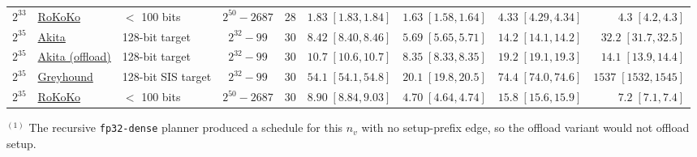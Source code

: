 \begin{table}[H]
\begin{tabular}{@{}lllccrrrr@{}}
$2^{33}$ & \href{https://github.com/lattice-arguments/rokoko/commit/5caba472334f7764645ea2c7c5d612353a670121}{RoKoKo} & $<$ 100 bits & $2^{50}-2687$ & 28 & $1.83\;[1.83, 1.84]$ & $1.63\;[1.58, 1.64]$ & $4.33\;[4.29, 4.34]$ & $4.3\;[4.2, 4.3]$ \\
\addlinespace
$2^{35}$ & \href{https://github.com/LayerZero-Labs/akita/commit/12d486b0bca2814956d480aa121130e2702f8612}{Akita} & 128-bit target & $2^{32}-99$ & 30 & $8.42\;[8.40, 8.46]$ & $5.69\;[5.65, 5.71]$ & $14.2\;[14.1, 14.2]$ & $32.2\;[31.7, 32.5]$ \\
$2^{35}$ & \href{https://github.com/LayerZero-Labs/akita/commit/12d486b0bca2814956d480aa121130e2702f8612}{Akita (offload)} & 128-bit target & $2^{32}-99$ & 30 & $10.7\;[10.6, 10.7]$ & $8.35\;[8.33, 8.35]$ & $19.2\;[19.1, 19.3]$ & $14.1\;[13.9, 14.4]$ \\
$2^{35}$ & \href{https://github.com/LayerZero-Labs/greyhound-reference/commit/672e74100496f6ef698ba35e241cf7593e3d57af}{Greyhound} & 128-bit SIS target & $2^{32}-99$ & 30 & $54.1\;[54.1, 54.8]$ & $20.1\;[19.8, 20.5]$ & $74.4\;[74.0, 74.6]$ & $1537\;[1532, 1545]$ \\
$2^{35}$ & \href{https://github.com/lattice-arguments/rokoko/commit/5caba472334f7764645ea2c7c5d612353a670121}{RoKoKo} & $<$ 100 bits & $2^{50}-2687$ & 30 & $8.90\;[8.84, 9.03]$ & $4.70\;[4.64, 4.74]$ & $15.8\;[15.6, 15.9]$ & $7.2\;[7.1, 7.4]$ \\
\bottomrule
\end{tabular}
\smallskip
{\footnotesize
\noindent$^{(1)}$ The recursive \texttt{fp32-dense} planner produced a schedule for this $n_v$ with no setup-prefix edge, so the offload variant would not offload setup.\\
}
\end{table}


